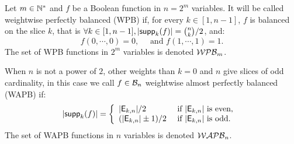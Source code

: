 \documentclass{llncs}
\begin{document}
\begin{definition}\label{def:WPB}
	Let $m\in \mathbb{N}^*$ and $f$ be a Boolean function in $n=2^m$ variables. It will be called weightwise perfectly balanced (WPB) if, for every $k\in[1,n-1]$, $f$ is balanced on the slice $k$, that is $\forall k \in [1,n-1], |\mathsf{supp}_{k}(f)|=\binom{n}{k}/2$, and:
	\ifnum{}
	\vspace{-0.3cm}
	\else
	\fi
	\[f(0,\cdots,0)=0,\quad \text{ and } f(1,\cdots,1)=1.\]	
	The set of WPB functions in $2^m$ variables is denoted $\mathcal{WPB}_{m}$.
	
	When $n$ is not a power of $2$, other weights than $k=0$ and $n$ give slices of odd cardinality, in this case we call $f\in \mathcal{B}_{n}$ weightwise almost perfectly balanced (WAPB) if: 
	\[|\mathsf{supp}_{k}(f)|= \left \{
	\begin{array}{l l}
	|\mathsf{E}_{k,n}|/2  & \text{ if } |\mathsf{E}_{k,n}| \text{ is even, } \\
	(|\mathsf{E}_{k,n}|\pm 1)/2  & \text{ if }  |\mathsf{E}_{k,n}| \text{ is odd.}
	\end{array}\right.\]
	The set of WAPB functions in $n$ variables is denoted $\mathcal{WAPB}_{n}$.	
	
\end{definition}
\fi
% 	
\end{document}

